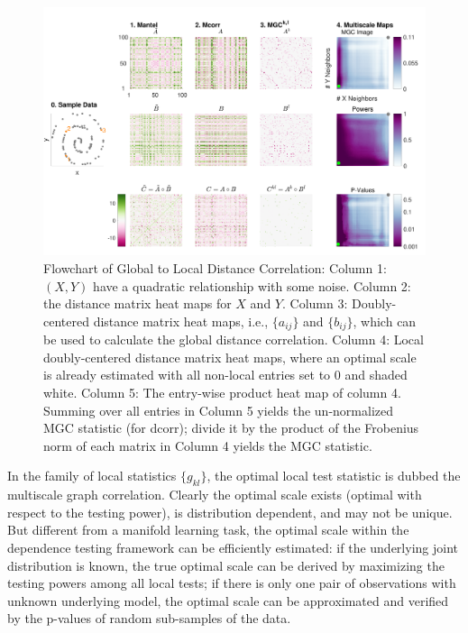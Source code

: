 \documentclass[11pt]{article}
\begin{document}
\begin{figure}[htbp]
\includegraphics[width=1.0\textwidth]{../Figures/FigA}
\caption{
Flowchart of Global to Local Distance Correlation: Column 1: $(X,Y)$ have a quadratic relationship with some noise. Column 2: the distance matrix heat maps for $X$ and $Y$. Column 3: Doubly-centered distance matrix heat maps, i.e., $\{a_{ij}\}$ and $\{b_{ij}\}$, which can be used to calculate the global distance correlation. Column 4: Local doubly-centered distance matrix heat maps, where an optimal scale is already estimated with all non-local entries set to $0$ and shaded white. Column 5: The entry-wise product heat map of column 4. Summing over all entries in Column 5 yields the un-normalized MGC statistic (for dcorr); divide it by the product of the Frobenius norm of each matrix in Column 4 yields the MGC statistic. }
\label{fig:A}
\end{figure}

In the family of local statistics $\{g_{kl}\}$, the optimal local test statistic is dubbed the multiscale graph correlation. Clearly the optimal scale exists (optimal with respect to the testing power), is distribution dependent, and may not be unique. But different from a manifold learning task, the optimal scale within the dependence testing framework can be efficiently estimated: if the underlying joint distribution is known, the true optimal scale can be derived by maximizing the testing powers among all local tests; if there is only one pair of observations with unknown underlying model, the optimal scale can be approximated and verified by the p-values of random sub-samples of the data. %
\end{document}
